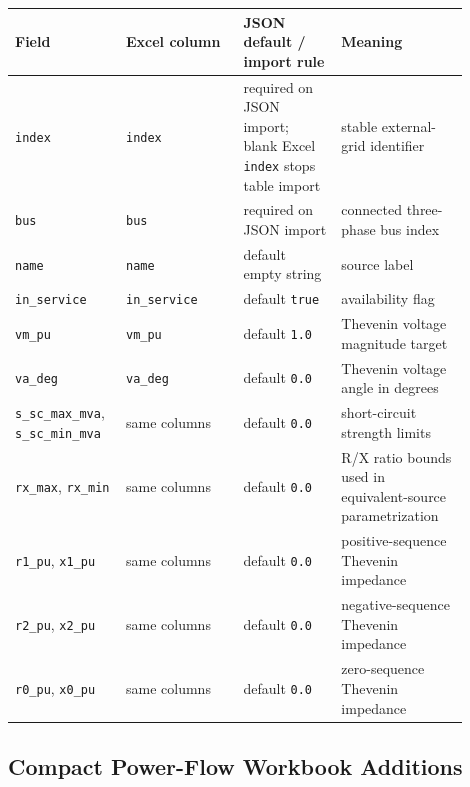 \begin{longtable}{L{0.20\linewidth}L{0.24\linewidth}L{0.20\linewidth}L{0.26\linewidth}}
\toprule
Field & Excel column & JSON default / import rule & Meaning \\
\midrule
\endhead
\texttt{index} & \texttt{index} & required on JSON import; blank Excel \texttt{index} stops table import & stable external-grid identifier \\
\texttt{bus} & \texttt{bus} & required on JSON import & connected three-phase bus index \\
\texttt{name} & \texttt{name} & default empty string & source label \\
\texttt{in\_service} & \texttt{in\_service} & default \texttt{true} & availability flag \\
\texttt{vm\_pu} & \texttt{vm\_pu} & default \texttt{1.0} & Thevenin voltage magnitude target \\
\texttt{va\_deg} & \texttt{va\_deg} & default \texttt{0.0} & Thevenin voltage angle in degrees \\
\texttt{s\_sc\_max\_mva}, \texttt{s\_sc\_min\_mva} & same columns & default \texttt{0.0} & short-circuit strength limits \\
\texttt{rx\_max}, \texttt{rx\_min} & same columns & default \texttt{0.0} & R/X ratio bounds used in equivalent-source parametrization \\
\texttt{r1\_pu}, \texttt{x1\_pu} & same columns & default \texttt{0.0} & positive-sequence Thevenin impedance \\
\texttt{r2\_pu}, \texttt{x2\_pu} & same columns & default \texttt{0.0} & negative-sequence Thevenin impedance \\
\texttt{r0\_pu}, \texttt{x0\_pu} & same columns & default \texttt{0.0} & zero-sequence Thevenin impedance \\
\bottomrule
\end{longtable}

\normalsize

\subsection{Compact Power-Flow Workbook Additions}

